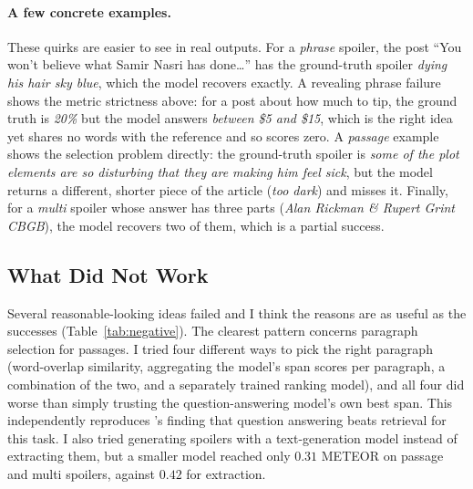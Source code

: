 \documentclass[11pt]{article}
\begin{document}
\paragraph{A few concrete examples.}
These quirks are easier to see in real outputs. For a \textit{phrase} spoiler, the
post ``You won't believe what Samir Nasri has done\ldots'' has the ground-truth
spoiler \textit{dying his hair sky blue}, which the model recovers exactly. A
revealing phrase failure shows the metric strictness above: for a post
about how much to tip, the ground truth is \textit{20\%} but the model answers
\textit{between \$5 and \$15}, which is the right idea yet shares no words with the
reference and so scores zero. A \textit{passage} example shows the selection
problem directly: the ground-truth spoiler is \textit{some of the plot elements
are so disturbing that they are making him feel sick}, but the model returns a
different, shorter piece of the article (\textit{too dark}) and misses it.
Finally, for a \textit{multi} spoiler whose answer has three parts (\textit{Alan
Rickman \& Rupert Grint CBGB}), the model recovers two of them, which is a partial success.

\subsection{What Did Not Work}
\label{sec:negative}
Several reasonable-looking ideas failed and I think the reasons are as useful as
the successes (Table~\ref{tab:negative}). The clearest pattern concerns paragraph
selection for passages. I tried four different ways to pick the right paragraph
(word-overlap similarity, aggregating the model's span scores per paragraph, a
combination of the two, and a separately trained ranking model), and all four did
worse than simply trusting the question-answering model's own best span. This
independently reproduces \citet{hagen2022}'s finding that question answering beats
retrieval for this task. I also tried generating spoilers with a text-generation
model instead of extracting them, but a smaller model reached only $0.31$
METEOR on passage and multi spoilers, against $0.42$ for extraction. 
\end{document}
